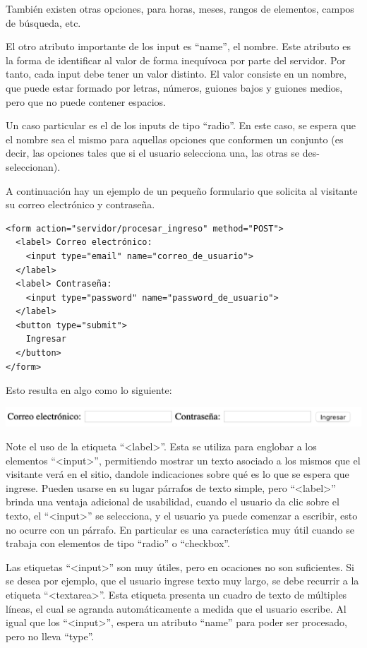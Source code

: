 También existen otras opciones, para horas, meses, rangos de elementos, campos
de búsqueda, etc.

El otro atributo importante de los input es ``name'', el nombre. Este atributo
es la forma de identificar al valor de forma inequívoca por parte del servidor.
Por tanto, cada input debe tener un valor distinto. El valor consiste en un
nombre, que puede estar formado por letras, números, guiones bajos y guiones
medios, pero que no puede contener espacios.

Un caso particular es el de los inputs de tipo ``radio''. En este caso, se espera
que el nombre sea el mismo para aquellas opciones que conformen un conjunto (es
decir, las opciones tales que si el usuario selecciona una, las otras se
des-seleccionan).

A continuación hay un ejemplo de un pequeño formulario que solicita al visitante
su correo electrónico y contraseña.

\begin{lstlisting}[language=XHTML]
<form action="servidor/procesar_ingreso" method="POST">
  <label> Correo electrónico:
    <input type="email" name="correo_de_usuario">
  </label>
  <label> Contraseña:
    <input type="password" name="password_de_usuario">
  </label>
  <button type="submit">
    Ingresar
  </button>
</form>
\end{lstlisting}

Esto resulta en algo como lo siguiente:

\includegraphics[scale=0.7]{anexos/html/imagenes/form_sample_login.png}

Note el uso de la etiqueta ``<label>''. Esta se utiliza para englobar a los
elementos ``<input>'', permitiendo mostrar un texto asociado a los mismos
que el visitante verá en el sitio, dandole indicaciones sobre qué es lo que
se espera que ingrese. Pueden usarse en su lugar párrafos de texto simple,
pero ``<label>'' brinda una ventaja adicional de usabilidad, cuando el
usuario da clic sobre el texto, el ``<input>'' se selecciona, y el usuario
ya puede comenzar a escribir, esto no ocurre con un párrafo. En particular
es una característica muy útil cuando se trabaja con elementos de tipo
``radio'' o ``checkbox''.

Las etiquetas ``<input>'' son muy útiles, pero en ocaciones no son suficientes.
Si se desea por ejemplo, que el usuario ingrese texto muy largo, se debe recurrir
a la etiqueta ``<textarea>''. Esta etiqueta presenta un cuadro de texto de
múltiples líneas, el cual se agranda automáticamente a medida que el usuario
escribe. Al igual que los ``<input>'', espera un atributo ``name'' para poder
ser procesado, pero no lleva ``type''.

